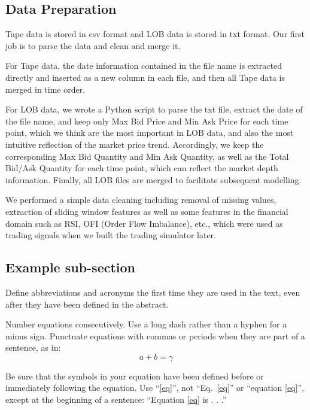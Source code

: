 \documentclass[conference]{IEEEtran}
\begin{document}
\subsection{Data Preparation}
Tape data is stored in csv format and LOB data is stored in txt format. Our first job is to parse the data and clean and merge it.

For Tape data, the date information contained in the file name is extracted directly and inserted as a new column in each file, and then all Tape data is merged in time order.

For LOB data, we wrote a Python script to parse the txt file, extract the date of the file name, and keep only Max Bid Price and Min Ask Price for each time point, which we think are the most important in LOB data, and also the most intuitive reflection of the market price trend. Accordingly, we keep the corresponding Max Bid Quantity and Min Ask Quantity, as well as the Total Bid/Ask Quantity for each time point, which can reflect the market depth information. Finally, all LOB files are merged to facilitate subsequent modelling.

We performed a simple data cleaning including removal of missing values, extraction of sliding window features as well as some features in the financial domain such as RSI, OFI (Order Flow Imbalance), etc., which were used as trading signals when we built the trading simulator later.


\subsection{Example sub-section}\label{AA}
Define abbreviations and acronyms the first time they are used in the text, 
even after they have been defined in the abstract.

Number equations consecutively. Use a long dash rather than a hyphen for a minus
sign. Punctuate equations with commas or periods when they are part of a 
sentence, as in:
\begin{equation}
a+b=\gamma\label{eq}
\end{equation}

Be sure that the 
symbols in your equation have been defined before or immediately following 
the equation. Use ``\eqref{eq}'', not ``Eq.~\eqref{eq}'' or ``equation \eqref{eq}'', except at 
the beginning of a sentence: ``Equation \eqref{eq} is . . .''
\end{document}

